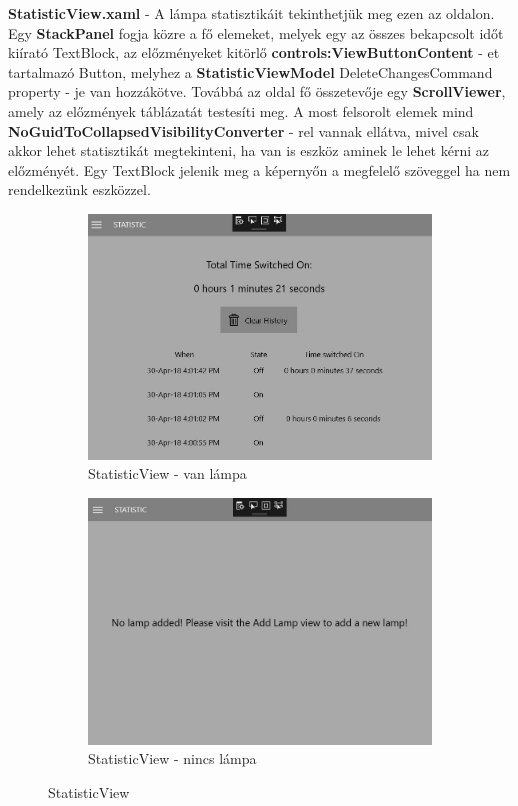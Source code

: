 \documentclass[a4paper,12pt]{report}
\begin{document}
    \textbf{StatisticView.xaml} - A lámpa statisztikáit tekinthetjük meg ezen az oldalon. Egy \textbf{StackPanel} fogja közre a fő
    elemeket, melyek egy az összes bekapcsolt időt kiírató TextBlock, az előzményeket kitörlő \textbf{controls:ViewButtonContent} - et tartalmazó
    Button, melyhez a \textbf{StatisticViewModel} DeleteChangesCommand property - je van hozzákötve. Továbbá az oldal fő összetevője egy \textbf{ScrollViewer},
    amely az előzmények táblázatát testesíti meg. A most felsorolt elemek mind \textbf{NoGuidToCollapsedVisibilityConverter} - rel vannak ellátva,
    mivel csak akkor lehet statisztikát megtekinteni, ha van is eszköz aminek le lehet kérni az előzményét. Egy TextBlock jelenik meg a képernyőn a megfelelő
    szöveggel ha nem rendelkezünk eszközzel.

    \begin{figure}[H]
        \centering
        \begin{subfigure}[b]{0.4\linewidth}
            \includegraphics[width=\linewidth]{images/statisticview.jpg}
            \caption{StatisticView - van lámpa}
        \end{subfigure}
        \begin{subfigure}[b]{0.4\linewidth}
            \includegraphics[width=\linewidth]{images/statisticnolamp.jpg}
            \caption{StatisticView - nincs lámpa}
        \end{subfigure}
        \caption{StatisticView}
        \label{fig:StatisticView}
    \end{figure}
\end{document}
